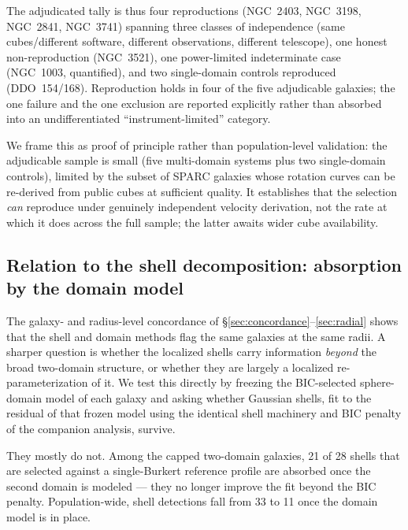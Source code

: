 \documentclass[twocolumn]{aastex701}
\begin{document}
The adjudicated tally is thus four reproductions (NGC~2403, NGC~3198,
NGC~2841, NGC~3741) spanning three classes of independence (same
cubes/different software, different observations, different telescope), one
honest non-reproduction (NGC~3521), one power-limited indeterminate case
(NGC~1003, quantified), and two single-domain controls reproduced
(DDO~154/168). Reproduction holds in four of the five adjudicable galaxies;
the one failure and the one exclusion are reported explicitly rather than
absorbed into an undifferentiated ``instrument-limited'' category.

We frame this as proof of principle rather than population-level validation: the
adjudicable sample is small (five multi-domain systems plus two single-domain
controls), limited by the subset of SPARC galaxies whose rotation curves can be
re-derived from public cubes at sufficient quality. It establishes that the selection
\emph{can} reproduce under genuinely independent velocity derivation, not the rate at
which it does across the full sample; the latter awaits wider cube availability.

\subsection{Relation to the shell decomposition: absorption by the domain model} \label{sec:absorption}

The galaxy- and radius-level concordance of \S\ref{sec:concordance}--\ref{sec:radial}
shows that the shell and domain methods flag the same galaxies at the same radii.
A sharper question is whether the localized shells carry information \emph{beyond}
the broad two-domain structure, or whether they are largely a localized
re-parameterization of it. We test this directly by freezing the BIC-selected
sphere-domain model of each galaxy and asking whether Gaussian shells, fit to the
residual of that frozen model using the identical shell machinery and BIC penalty
of the companion analysis, survive.

They mostly do not. Among the capped two-domain galaxies, 21 of 28 shells that
are selected against a single-Burkert reference profile are absorbed once the second
domain is modeled --- they no longer improve the fit beyond the BIC penalty.
Population-wide, shell detections fall from 33 to 11 once the domain model is in
place.
\end{document}
